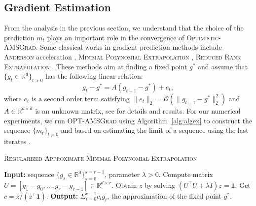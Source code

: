 \documentclass[11pt]{article}
\theoremstyle{k}
\begin{document}
\subsection{Gradient Estimation}
From the analysis in the previous section, we understand that the choice of the prediction $m_t$ plays an important role in the convergence of \textsc{Optimistic-AMSGrad}.
Some classical works in gradient prediction methods include \textsc{Anderson} acceleration \citep{WN11}, \textsc{Minimal Polynomial Extrapolation} \citep{CJ76},  \textsc{Reduced Rank Extrapolation} \citep{E79}.
These methods aim at finding a fixed point $g^{*}$ and assume that $\{g_t \in \mathbb R^d\}_{t>0} $ has the following linear relation:\vspace{-0.1cm}
\begin{equation} \label{nox}
g_t - g^* = A( g_{t-1} - g^* ) + e_t,
\end{equation}
where $e_t$ is a second order term satisfying $\| e_t \|_2  = \mathcal{O}( \| g_{t-1} - g^* \|_2^2)$ and $A \in \mathbb R^{d \times d}$ is an unknown matrix, see \citep{SAB16} for details and results.
For our numerical experiments, we run \textsc{OPT-AMSGrad} using Algorithm~\ref{alg:algex} to construct the sequence $\{m_t\}_{t>0}$ and based on estimating the limit of a sequence using the last iterates \citep{BZ13}.
\begin{algorithm}[h]
\begin{algorithmic}[1] 
\small
\caption{\textsc{Regularized Approximate Minimal Polynomial Extrapolation}
\citep{SAB16} } \label{alg:algex}
\STATE \textbf{Input:} sequence $\{ g_s \in \mathbb R^d \}_{s=0}^{s=r-1}$, parameter $\lambda > 0$.
\STATE Compute matrix  $U = [ g_1 - g_0, \dots, g_{r} - g_{r-1}] \in \mathbb R^{d \times r}$.
\STATE Obtain $z$ by solving $(U^\top U + \lambda I ) z = \mathbf{1}$.
\STATE Get $c= z / (z^\top \mathbf{1})$.
\STATE \textbf{Output:} $\Sigma_{i=0}^{r-1} c_i g_i$, the approximation of the fixed point $g^*$.
\end{algorithmic}
\end{algorithm}
\end{document}
